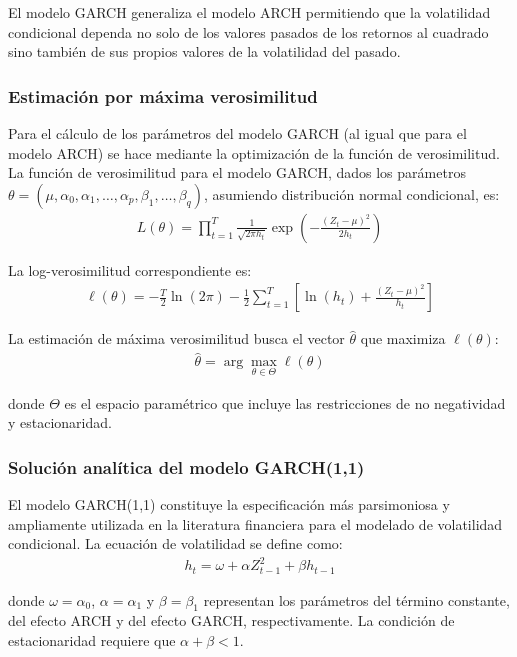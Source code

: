 El modelo GARCH generaliza el modelo ARCH permitiendo que la volatilidad condicional dependa no solo de los valores pasados de los retornos al cuadrado sino también de sus propios valores de la volatilidad del pasado. 
\subsubsection{Estimación por máxima verosimilitud}

Para el cálculo de los parámetros del modelo GARCH (al igual que para el modelo ARCH) se hace mediante la optimización de la función de verosimilitud. La función de verosimilitud para el modelo GARCH, dados los parámetros $\theta = (\mu, \alpha_0, \alpha_1, \ldots, \alpha_p, \beta_1, \ldots, \beta_q)$, asumiendo distribución normal condicional, es:
\begin{align*}
    L(\theta) = \prod_{t=1}^{T} \frac{1}{\sqrt{2\pi h_t}} \exp\left(-\frac{(Z_t - \mu)^2}{2h_t}\right)
\end{align*}

La log-verosimilitud correspondiente es:
\begin{align*}
    \ell(\theta) = -\frac{T}{2}\ln(2\pi) - \frac{1}{2}\sum_{t=1}^{T}\left[\ln(h_t) + \frac{(Z_t - \mu)^2}{h_t}\right]
\end{align*}

La estimación de máxima verosimilitud busca el vector $\hat{\theta}$ que maximiza $\ell(\theta)$:
\begin{align*}
    \hat{\theta} = \arg\max_{\theta \in \Theta} \ell(\theta)
\end{align*}

donde $\Theta$ es el espacio paramétrico que incluye las restricciones de no negatividad y estacionaridad.

\subsubsection{Solución analítica del modelo GARCH(1,1)}

El modelo GARCH(1,1) constituye la especificación más parsimoniosa y ampliamente utilizada en la literatura financiera para el modelado de volatilidad condicional. La ecuación de volatilidad se define como:
\begin{align}
    h_t = \omega + \alpha Z_{t-1}^2 + \beta h_{t-1}
\end{align}

donde $\omega = \alpha_0$, $\alpha = \alpha_1$ y $\beta = \beta_1$ representan los parámetros del término constante, del efecto ARCH y del efecto GARCH, respectivamente. La condición de estacionaridad requiere que $\alpha + \beta < 1$.

